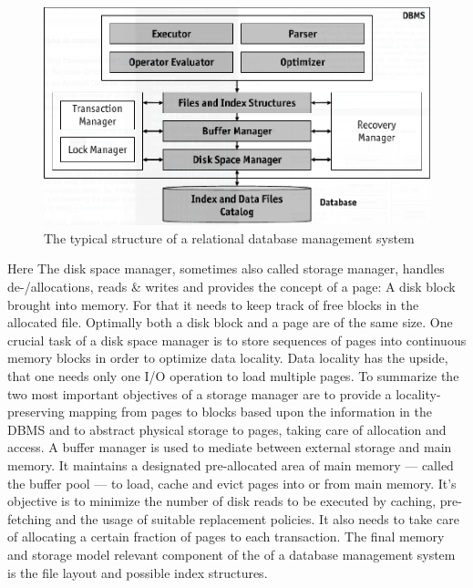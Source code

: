 \documentclass[a4paper,10pt]{article}
\begin{document}
\begin{figure}[htp]
 \begin{center}
  \includegraphics[keepaspectratio,width=\textwidth]{img/RDBMS.png}
 \end{center}
 \caption{The typical structure of a relational database management system } %
\end{figure}
Here The disk space manager, sometimes also called storage manager, handles de-/allocations, reads \& writes and provides the concept of a page: A disk block brought into memory. For that it needs to keep track of free blocks in the allocated file. Optimally both a disk block and a page are of the same size. One crucial task of a disk space manager is to store sequences of pages into continuous memory blocks in order to optimize data locality. Data locality has the upside, that one needs only one I/O operation to load multiple pages. To summarize the two most important objectives of a storage manager are to provide a locality-preserving mapping from pages to blocks based upon the information in the DBMS and to abstract physical storage to pages, taking care of allocation and access.
A buffer manager is used to mediate between external storage and main memory. It maintains a designated pre-allocated area of main memory --- called the buffer pool --- to load, cache and evict pages into or from main memory. It's objective is to minimize the number of disk reads to be executed by caching, pre-fetching and the usage of suitable replacement policies. It also needs to take care of allocating a certain fraction of pages to each transaction.
The final memory and storage model relevant component of the  of a database management system is the file layout and possible index structures. 
\end{document}
